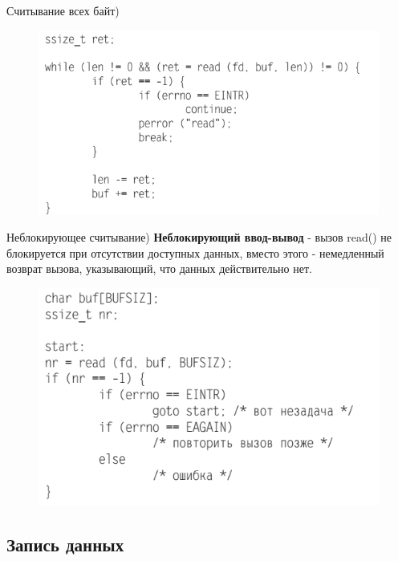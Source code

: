 \documentclass{beamer}
\begin{document}
\begin{frame}{Считывание всех байт)}
\begin{figure}[h]
\centering
\includegraphics[scale=0.6]{images/lec06-pic09.png}
\end{figure}
\end{frame}

\begin{frame}{Неблокирующее считывание)}
\textbf{Неблокирующий ввод-вывод} - вызов read() не блокируется при отсутствии доступных данных, вместо этого - немедленный возврат вызова, указывающий, что данных действительно нет. 
\begin{figure}[h]
\centering
\includegraphics[scale=0.6]{images/lec06-pic10.png}
\end{figure}
\end{frame}

\subsection{Запись данных}
\end{document}
